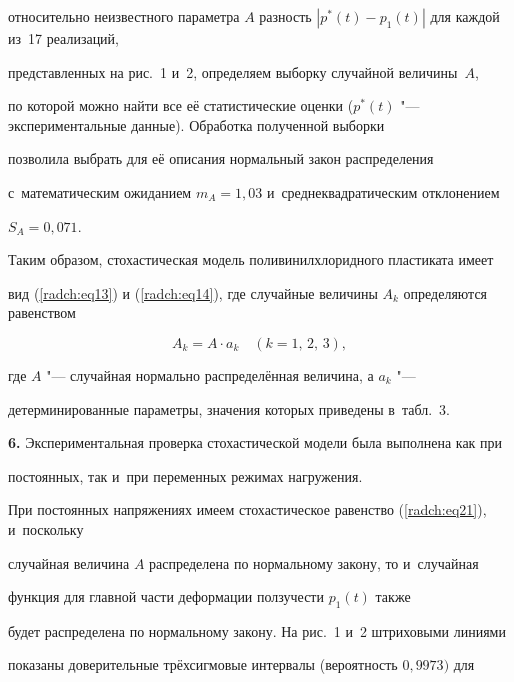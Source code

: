 относительно неизвестного параметра $A$ разность $\left| {p^\ast \left( t 

\right) - p_1 \left( t \right)} \right|$ для каждой из~17 реализаций, 

представленных на рис.~1 и~2, определяем выборку случайной величины~$A$, 

по которой можно найти все её статистические  оценки ($p^\ast \left( t 

\right)$ "--- экспериментальные данные). Обработка полученной выборки 

позволила выбрать для её описания нормальный закон распределения 

с~математическим ожиданием $m_A = 1{,}03$ и~среднеквадратическим отклонением 

$S_A = 0{,}071$.



Таким образом, стохастическая модель поливинилхлоридного пластиката имеет 

вид (\ref{radch:eq13}) и (\ref{radch:eq14}), где случайные величины $A_k $ определяются равенством

\begin{equation}

\label{radch:eq22}

A_k = A \cdot a_k 

\quad

\left( k = 1,\,2,\,3 \right),

\end{equation}

где $A$ "--- случайная нормально распределённая величина, а $a_k $ "--- 

детерминированные параметры, значения которых приведены в~табл.~3.



\textbf{6.} Экспериментальная проверка стохастической модели была выполнена как при 

постоянных, так и~при переменных режимах нагружения.



При постоянных напряжениях имеем стохастическое равенство (\ref{radch:eq21}), и~поскольку 

случайная величина $A$ распределена по нормальному закону, то и~случайная 

функция для главной части деформации ползучести $p_1 \left( t \right)$ также 

будет распределена по нормальному закону. На рис.~1 и~2 штриховыми линиями 

показаны доверительные трёхсигмовые интервалы (вероятность $0{,}9973)$ для 

